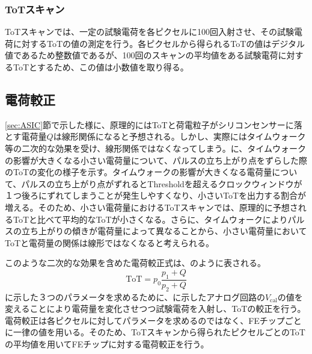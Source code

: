 \subsubsection{ToTスキャン}
\label{sec:totscan}
ToTスキャンでは、一定の試験電荷を各ピクセルに100回入射させ、その試験電荷に対するToTの値の測定を行う。各ピクセルから得られるToTの値はデジタル値であるため整数値であるが、100回のスキャンの平均値をある試験電荷に対するToTとするため、この値は小数値を取り得る。


\subsection{電荷較正}
\label{sec:calibration}
\ref{sec:ASIC}節で示した様に、原理的にはToTと荷電粒子がシリコンセンサーに落とす電荷量$Q$は線形関係になると予想される。しかし、実際にはタイムウォーク等の二次的な効果を受け、線形関係ではなくなってしまう。に、タイムウォークの影響が大きくなる小さい電荷量について、パルスの立ち上がり点をずらした際のToTの変化の様子を示す。タイムウォークの影響が大きくなる電荷量について、パルスの立ち上がり点がずれるとThresholdを超えるクロックウィンドウが１つ後ろにずれてしまうことが発生しやすくなり、小さいToTを出力する割合が増える。そのため、小さい電荷量におけるToTスキャンでは、原理的に予想されるToTと比べて平均的なToTが小さくなる。さらに、タイムウォークによりパルスの立ち上がりの傾きが電荷量によって異なることから、小さい電荷量においてToTと電荷量の関係は線形ではなくなると考えられる。

このような二次的な効果を含めた電荷較正式は、のように表される。
\begin{equation}
  \label{eq:calibration}
  \mathrm{ToT} = p_0\frac{p_1 + Q}{p_2 + Q}
\end{equation}
に示した３つのパラメータを求めるために、に示したアナログ回路の$V_\mathrm{cal}$の値を変えることにより電荷量を変化させつつ試験電荷を入射し、ToTの較正を行う。電荷較正は各ピクセルに対してパラメータを求めるのではなく、FEチップごとに一律の値を用いる。そのため、ToTスキャンから得られたピクセルごとのToTの平均値を用いてFEチップに対する電荷較正を行う。


